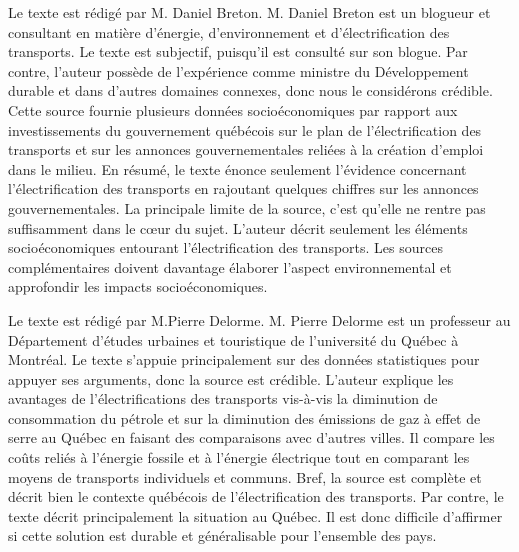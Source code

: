 Le texte  est rédigé par M. Daniel Breton. M. Daniel Breton est un blogueur et consultant en matière d’énergie, d’environnement et d’électrification des transports. Le texte est subjectif, puisqu’il est consulté sur son blogue. Par contre, l’auteur possède de l’expérience comme ministre du Développement durable et dans d’autres domaines connexes, donc nous le considérons crédible. Cette source fournie plusieurs données socioéconomiques par rapport aux investissements du gouvernement québécois sur le plan de l'électrification des transports et sur les annonces gouvernementales reliées à la création d’emploi dans le milieu. En résumé, le texte énonce seulement l’évidence concernant l’électrification des transports en rajoutant quelques chiffres sur les annonces gouvernementales. La principale limite de la source, c’est qu’elle ne rentre pas suffisamment dans le c\oe ur du sujet. L’auteur décrit seulement les éléments socioéconomiques entourant l’électrification des transports. Les sources complémentaires doivent davantage élaborer l’aspect environnemental et approfondir les impacts socioéconomiques.  

Le texte  est rédigé par M.Pierre Delorme.
M. Pierre Delorme est un professeur au Département d’études urbaines et touristique de l’université du Québec à Montréal. Le texte s’appuie principalement sur des données statistiques pour appuyer ses arguments, donc la source est crédible. L’auteur explique les avantages de l’électrifications des transports vis-à-vis la diminution de consommation du pétrole et sur la diminution des émissions de gaz à effet de serre au Québec en faisant des comparaisons avec d’autres villes. Il compare les coûts reliés à l’énergie fossile et à l’énergie électrique tout en comparant les moyens de transports individuels et communs. Bref, la source est complète et décrit bien le contexte québécois de l’électrification des transports. Par contre, le texte décrit principalement la situation au Québec. Il est donc difficile d’affirmer si cette solution est durable et généralisable pour l’ensemble des pays. 

